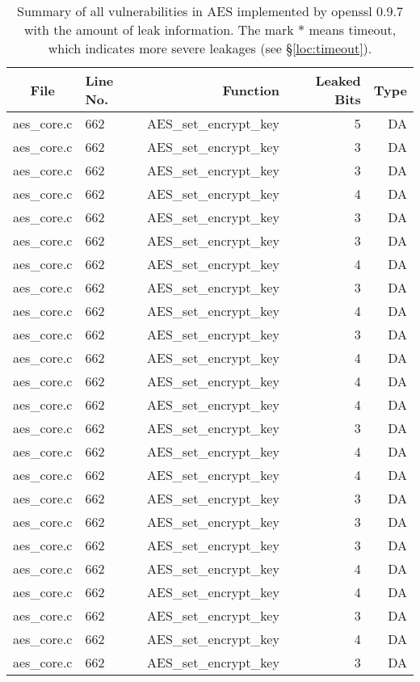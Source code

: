 \begin{table}%
\centering\tiny\scriptsize
\caption{Summary of all vulnerabilities in AES implemented by openssl 0.9.7 with the amount of leak information. The mark $*$ means timeout, which indicates more severe leakages (see \S\ref{loc:timeout}).}\label{tab:AESopenssl}
\begin{tabular}{clrrr}
\hline
\textbf{File} & \textbf{Line No.} & \textbf{Function} & \textbf{Leaked Bits} & \textbf{Type} \\\hline
aes\_core.c& 662&AES\_set\_encrypt\_key&5 &DA\\
aes\_core.c& 662&AES\_set\_encrypt\_key&3 &DA\\
aes\_core.c& 662&AES\_set\_encrypt\_key&3 &DA\\
aes\_core.c& 662&AES\_set\_encrypt\_key&4 &DA\\
aes\_core.c& 662&AES\_set\_encrypt\_key&3 &DA\\
aes\_core.c& 662&AES\_set\_encrypt\_key&3 &DA\\
aes\_core.c& 662&AES\_set\_encrypt\_key&4 &DA\\
aes\_core.c& 662&AES\_set\_encrypt\_key&3 &DA\\
aes\_core.c& 662&AES\_set\_encrypt\_key&4 &DA\\
aes\_core.c& 662&AES\_set\_encrypt\_key&3 &DA\\
aes\_core.c& 662&AES\_set\_encrypt\_key&4 &DA\\
aes\_core.c& 662&AES\_set\_encrypt\_key&4 &DA\\
aes\_core.c& 662&AES\_set\_encrypt\_key&4 &DA\\
aes\_core.c& 662&AES\_set\_encrypt\_key&3 &DA\\
aes\_core.c& 662&AES\_set\_encrypt\_key&4 &DA\\
aes\_core.c& 662&AES\_set\_encrypt\_key&4 &DA\\
aes\_core.c& 662&AES\_set\_encrypt\_key&3 &DA\\
aes\_core.c& 662&AES\_set\_encrypt\_key&3 &DA\\
aes\_core.c& 662&AES\_set\_encrypt\_key&3 &DA\\
aes\_core.c& 662&AES\_set\_encrypt\_key&4 &DA\\
aes\_core.c& 662&AES\_set\_encrypt\_key&4 &DA\\
aes\_core.c& 662&AES\_set\_encrypt\_key&3 &DA\\
aes\_core.c& 662&AES\_set\_encrypt\_key&4 &DA\\
aes\_core.c& 662&AES\_set\_encrypt\_key&3 &DA\\

\end{tabular}
\end{table}
